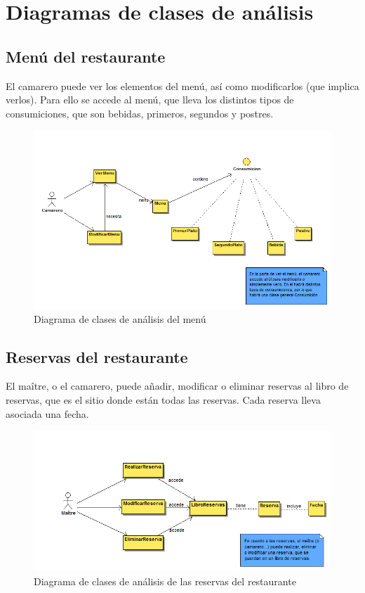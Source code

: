 \documentclass[spanish,a4paper,11pt, twoside]{report}	%
\begin{document}
	\section{Diagramas de clases de análisis}
		\subsection{Menú del restaurante}
		El camarero puede ver los elementos del menú, así como modificarlos (que implica verlos). Para ello se accede al menú, que lleva los distintos tipos de consumiciones, que son bebidas, primeros, segundos y postres.
		\begin{figure}[!h]
		\centering
		\includegraphics[scale=0.5]{DCAmenu.png}
		\caption{Diagrama de clases de análisis del menú}
		\end{figure}

		\subsection{Reservas del restaurante}
		El maître, o el camarero, puede añadir, modificar o eliminar reservas al libro de reservas, que es el sitio donde están todas las reservas. Cada reserva lleva asociada una fecha.
		\begin{figure}[!h]
		\centering
		\includegraphics[scale=0.5]{DCAresevas.png}
		\caption{Diagrama de clases de análisis de las reservas del restaurante}
		\end{figure}
\end{document}
